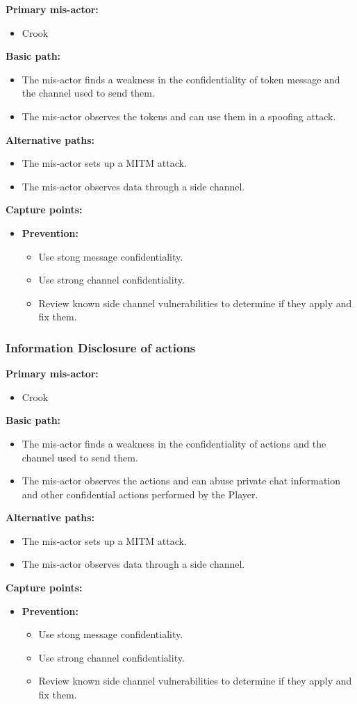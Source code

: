 \documentclass[a4paper,11pt]{report}
\begin{document}
\textbf{Primary mis-actor:}
\begin{itemize}
\item Crook
\end{itemize}
\textbf{Basic path:}
\begin{itemize}
\item The mis-actor finds a weakness in the confidentiality of token message and the channel used to send them.
\item The mis-actor observes the tokens and can use them in a spoofing attack.
\end{itemize}
\textbf{Alternative paths:}
\begin{itemize}
\item The mis-actor sets up a MITM attack.
\item The mis-actor observes data through a side channel.
\end{itemize}
\textbf{Capture points:}
\begin{itemize}
\item \textbf{Prevention:}
\begin{itemize}
\item Use stong message confidentiality.
\item Use strong channel confidentiality.
\item Review known side channel vulnerabilities to determine if they apply and fix them.
\end{itemize}
\end{itemize}

\subsubsection{Information Disclosure of actions}
\textbf{Primary mis-actor:}
\begin{itemize}
\item Crook
\end{itemize}
\textbf{Basic path:}
\begin{itemize}
\item The mis-actor finds a weakness in the confidentiality of actions and the channel used to send them.
\item The mis-actor observes the actions and can abuse private chat information and other confidential actions performed by the Player.
\end{itemize}
\textbf{Alternative paths:}
\begin{itemize}
\item The mis-actor sets up a MITM attack.
\item The mis-actor observes data through a side channel.
\end{itemize}
\textbf{Capture points:}
\begin{itemize}
\item \textbf{Prevention:}
\begin{itemize}
\item Use stong message confidentiality.
\item Use strong channel confidentiality.
\item Review known side channel vulnerabilities to determine if they apply and fix them.
\end{itemize}
\end{itemize}
\end{document}

